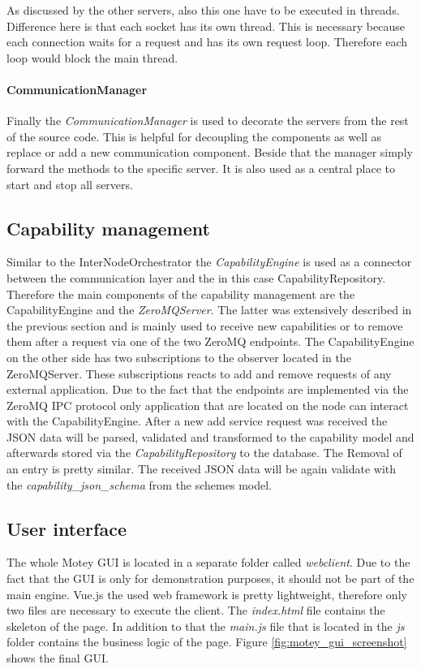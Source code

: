 As discussed by the other servers, also this one have to be executed in threads.
Difference here is that each socket has its own thread.
This is necessary because each connection waits for a request and has its own request loop.
Therefore each loop would block the main thread.

\paragraph{CommunicationManager}
Finally the \textit{CommunicationManager} is used to decorate the servers from the rest of the source code.
This is helpful for decoupling the components as well as replace or add a new communication component.
Beside that the manager simply forward the methods to the specific server.
It is also used as a central place to start and stop all servers.


\subsection{Capability management}
Similar to the InterNodeOrchestrator the \textit{CapabilityEngine} is used as a connector between the communication layer and the in this case CapabilityRepository.
Therefore the main components of the capability management are the CapabilityEngine and the \textit{ZeroMQServer}.
The latter was extensively described in the previous section and is mainly used to receive new capabilities or to remove them after a request via one of the two ZeroMQ endpoints.
The CapabilityEngine on the other side has two subscriptions to the observer located in the ZeroMQServer.
These subscriptions reacts to add and remove requests of any external application.
Due to the fact that the endpoints are implemented via the ZeroMQ \ac{IPC} protocol only application that are located on the node can interact with the CapabilityEngine.
After a new add service request was received the \ac{JSON} data will be parsed, validated and transformed to the capability model and afterwards stored via the \textit{CapabilityRepository} to the database.
The Removal of an entry is pretty similar.
The received \ac{JSON} data will be again validate with the \textit{capability\_json\_schema} from the schemes model.


\subsection{User interface}
The whole Motey \ac{GUI} is located in a separate folder called \textit{webclient}.
Due to the fact that the \ac{GUI} is only for demonstration purposes, it should not be part of the main engine.
Vue.js the used web framework is pretty lightweight, therefore only two files are necessary to execute the client.
The \textit{index.html} file contains the skeleton of the page.
In addition to that the \textit{main.js} file that is located in the \textit{js} folder contains the business logic of the page.
Figure \ref{fig:motey_gui_screenshot} shows the final \ac{GUI}.\newline

